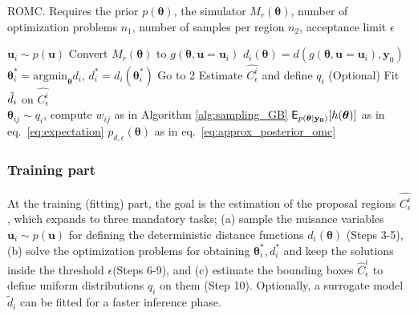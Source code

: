 \documentclass[article]{jss}
\newcommand{\ub}{\mathbf{u}}
\newcommand{\yb}{\mathbf{y}}
\newcommand{\thetab}{\boldsymbol{\theta}}
\newcommand{\data}{\mathbf{y_0}}
\newcommand{\accregioni}{C^i_{\epsilon}}
\newcommand{\accregionihat}{\hat{C}^i_{\epsilon}}
\begin{document}
\begin{algorithm}[!ht]
  \caption{ROMC. Requires the prior \( p(\thetab) \), the simulator
    \(M_r(\thetab)\), number of optimization problems \(n_1\), number
    of samples per region \(n_2\), acceptance limit
    \(\epsilon\)}\label{alg:romc_algorithm}
  \begin{algorithmic}[1]
    \State \(\ub_i \sim p(\ub)\) 
    \State Convert \(M_r(\thetab) \) to \( g(\thetab, \ub=\ub_i) \) 
      \State \( d_i(\thetab) = d(g(\thetab, \ub=\ub_i), \yb_0) \) 
      \State \(\thetab_i^* = \text{argmin}_{\thetab} d_i\), \(d_i^*=d_i(\thetab_i^*)\) 
        \State Go to 2 
      \EndIf
      \State Estimate \(\hat{\accregioni}\) and define \(q_i\) 
      \State (Optional) Fit \(\Tilde{d}_i\) on \(\hat{\accregioni}\) 
      \\\hrulefill
      \State \(\thetab_{ij} \sim q_i\), compute \(w_{ij}\) as in Algorithm \ref{alg:sampling_GB} 
      \EndFor
    \EndFor
    \State \(\E_{p(\thetab|\data)}[h(\thetab)]\) as in eq.~\eqref{eq:expectation} 
    \State \(p_{d,\epsilon}(\thetab) \) as in eq.~\eqref{eq:approx_posterior_omc} 
    \EndProcedure
  \end{algorithmic}
\end{algorithm}

\subsubsection*{Training part}
\noindent
At the training (fitting) part, the goal is the estimation of the
proposal regions \(\hat{\accregioni}\), which expands to three
mandatory tasks; (a) sample the nuisance variables
\(\ub_i \sim p(\ub)\) for defining the deterministic distance
functions \(d_i(\thetab)\) (Steps 3-5), (b) solve the optimization
problems for obtaining \(\thetab_i^*, d_i^*\) and keep the solutions
inside the threshold \(\epsilon\)(Steps 6-9), and (c) estimate the
bounding boxes \(\accregionihat\) to define uniform distributions
\(q_i\) on them (Step 10). Optionally, a surrogate model
\(\tilde{d}_i\) can be fitted for a faster inference phase.
\end{document}
